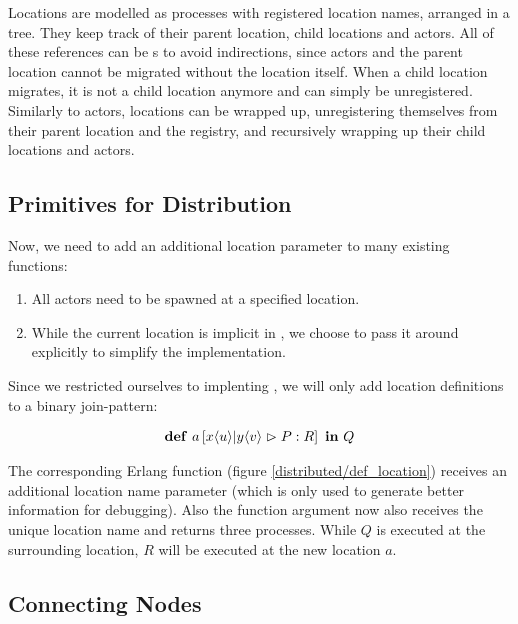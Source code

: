 Locations are modelled as processes with registered location names,
arranged in a tree.
They keep track of their parent location, child locations and actors.
All of these references can be \PID{}s to avoid indirections,
since actors and the parent location cannot be migrated without the location
itself.
When a child location migrates, it is not a child location anymore and can
simply be unregistered.
Similarly to actors, locations can be wrapped up,
unregistering themselves from their parent location and the registry,
and recursively wrapping up their child locations and actors.



\subsection{Primitives for Distribution}

Now, we need to add an additional location parameter to many existing functions:
\begin{enumerate}[nosep]
  \item
    All actors need to be spawned at a specified location.
  \item
    While the current location is implicit in \distjoincalc,
    we choose to pass it around explicitly to simplify the implementation.
\end{enumerate}

Since we restricted ourselves to implenting \corejoincalc,
we will only add location definitions to a binary join-pattern:

\begin{align*}
  \textbf{\textup{def}} \ a \left[ x\langle u\rangle | y\langle v\rangle \vartriangleright P : R \right] \ \textbf{\textup{in}} \ Q
\end{align*}

The corresponding Erlang function (figure \ref{distributed/def_location})
receives an additional location name parameter
(which is only used to generate better information for debugging).
Also the function argument now also receives the unique location name and
returns three processes.
While $Q$ is executed at the surrounding location,
$R$ will be executed at the new location $a$.







\subsection{Connecting Nodes}


